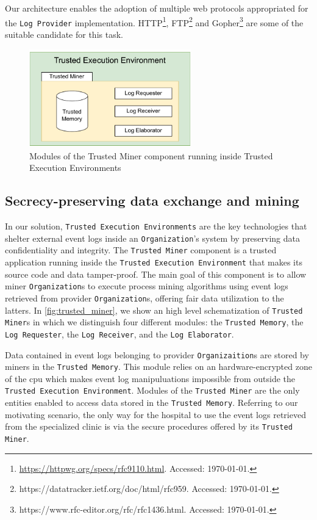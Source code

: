 Our architecture enables the adoption of multiple web protocols appropriated for the \texttt{Log Provider} implementation.
 HTTP\footnote{\url{https://httpwg.org/specs/rfc9110.html}. Accessed: \today.}, FTP\footnote{https://datatracker.ietf.org/doc/html/rfc959. Accessed: \today.} and Gopher\footnote{https://www.rfc-editor.org/rfc/rfc1436.html. Accessed: \today.} are some of the suitable candidate for this task.
\label{fig:trusted_miner}
\begin{figure}[t]
\centering
\includegraphics[width=7cm]{content/figures/Trusted_miner.pdf}
\caption{Modules of the Trusted Miner component running inside Trusted Execution Environments}
\label{fig:implementation}
\end{figure}




\subsection{Secrecy-preserving data exchange and mining}
In our solution, \texttt{Trusted Execution Environments} are the key technologies that shelter external event logs inside an \texttt{Organization}'s system by preserving data confidentiality and integrity. The \texttt{Trusted Miner} component is a trusted application running inside the \texttt{Trusted Execution Environment} that makes its source code and data tamper-proof. The main goal of this component is to allow miner \texttt{Organization}s to execute process mining algorithms using %
event logs retrieved from provider \texttt{Organization}s, offering fair data utilization to the latters. In \cref{fig:trusted_miner}, we show an high level schematization of \texttt{Trusted Miner}s in which we distinguish four different modules: the \texttt{Trusted Memory}, the \texttt{Log Requester}, the \texttt{Log Receiver}, and the \texttt{Log Elaborator}.

Data contained in event logs belonging to provider \texttt{Organizaition}s are stored by miners in the \texttt{Trusted Memory}. This module relies on an hardware-encrypted zone of the cpu which makes event log manipuluations impossible from outside the \texttt{Trusted Execution Environment}. Modules of the \texttt{Trusted Miner} are the only entities enabled to access data stored in the \texttt{Trusted Memory}. Referring to our motivating scenario, the only way for the hospital to use the event logs retrieved from the specialized clinic is via the secure procedures offered by its \texttt{Trusted Miner}.

